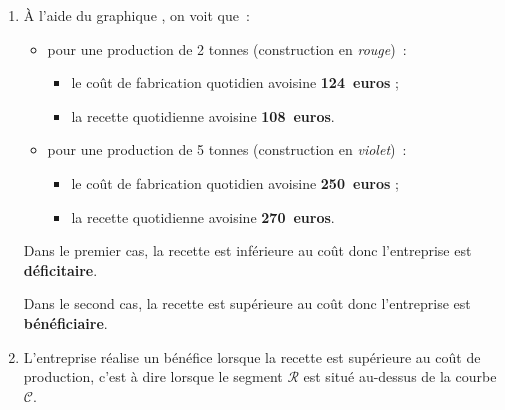 \begin{corrige}
\begin{enumerate}
          \par
          \item \`A l'aide du graphique , on voit que~:
          \begin{itemize}
               \item pour une production de 2 tonnes (construction en \textit{rouge})~:
               \begin{itemize}[label=---]
                    \item le coût de fabrication quotidien avoisine \textbf{124~euros} ;
                    \item la recette quotidienne avoisine \textbf{108~euros}.
               \end{itemize}
               \item pour une production de 5 tonnes (construction en \textit{violet})~:
               \begin{itemize}[label=---]
                    \item le coût de fabrication quotidien avoisine \textbf{250~euros} ;
                    \item la recette quotidienne avoisine \textbf{270~euros}.
               \end{itemize}
               \par
          \end{itemize}
          \par
          Dans le premier cas, la recette est inférieure au coût donc l'entreprise est \textbf{déficitaire}.
          \par
          Dans le second cas, la recette est supérieure au coût donc l'entreprise est \textbf{bénéficiaire}.
          \par
          \par
          \item L'entreprise réalise un bénéfice lorsque la recette est supérieure au coût de production, c'est à dire lorsque le segment $\mathscr{R}$ est situé au-dessus de la courbe $\mathscr{C}$.

\end{enumerate}
\end{corrige}
